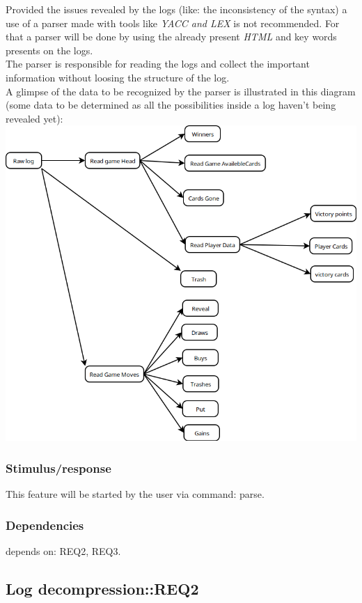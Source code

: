 \documentclass{scrreprt}
\begin{document}
Provided the issues revealed by the logs (like: the inconsistency of the syntax)
a use of a parser made with tools like \textit{YACC and LEX} is not recommended.
For that a parser will be done by using the already present \textit{HTML} and
key words presents on the logs.\\
The parser is responsible for reading the logs and collect the important
information without loosing the structure of the log.\\
A glimpse of the data to be recognized by the parser is illustrated in this
diagram (some data to be determined as all the possibilities inside a log
haven't being revealed yet):\\
\includegraphics[scale=0.35,keepaspectratio]{UseCaseParser}

\subsubsection{Stimulus/response}

This feature will be started by the user via command: parse.
\subsubsection{Dependencies}

depends on: REQ2, REQ3.





\subsection{Log decompression::REQ2}
\end{document}
